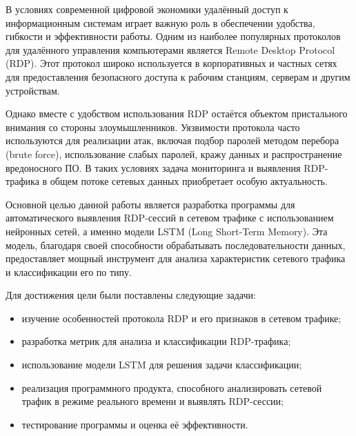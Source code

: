 \documentclass[bachelor, och, coursework]{SCWorks}
\begin{document}


\tableofcontents

\intro
В условиях современной цифровой экономики удалённый доступ к информационным системам играет важную роль в обеспечении удобства, 
гибкости и эффективности работы. Одним из наиболее популярных протоколов для удалённого управления компьютерами является Remote 
Desktop Protocol (RDP). Этот протокол широко используется в корпоративных и частных сетях для предоставления безопасного доступа 
к рабочим станциям, серверам и другим устройствам.


Однако вместе с удобством использования RDP остаётся объектом пристального внимания со стороны злоумышленников. Уязвимости протокола 
часто используются для реализации атак, включая подбор паролей методом перебора (brute force), использование слабых паролей, кражу 
данных и распространение вредоносного ПО. В таких условиях задача мониторинга и выявления RDP-трафика в общем потоке сетевых данных 
приобретает особую актуальность.


Основной целью данной работы является разработка программы для автоматического выявления RDP-сессий в сетевом трафике с использованием 
нейронных сетей, а именно модели LSTM (Long Short-Term Memory). Эта модель, благодаря своей способности обрабатывать последовательности данных, 
предоставляет мощный инструмент для анализа характеристик сетевого трафика и классификации его по типу.

Для достижения цели были поставлены следующие задачи:

\begin{itemize}
  \item изучение особенностей протокола RDP и его признаков в сетевом трафике;
  \item разработка метрик для анализа и классификации RDP-трафика;
  \item использование модели LSTM для решения задачи классификации;
  \item реализация программного продукта, способного анализировать сетевой трафик в режиме реального времени и выявлять RDP-сессии;
  \item тестирование программы и оценка её эффективности.
\end{itemize}
\end{document}
